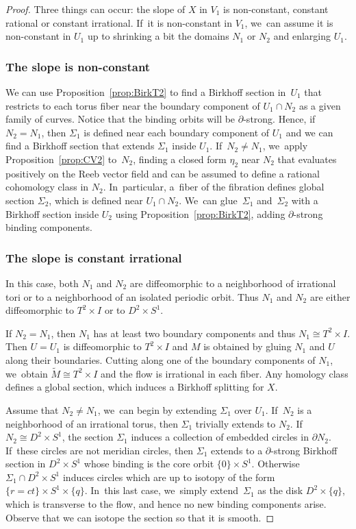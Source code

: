 \documentclass[JEP,XML,SOM,Unicode,NoEqCountersInSection,NoFloatCountersInSection,published]{cedram}
\theoremstyle{definition}
\begin{document}
\begin{proof}
Three things can occur: the slope of $X$ in $V_1$ is non-constant, constant rational or constant irrational. If~it is non-constant in $V_1$, we~can assume it is non-constant in $U_1$ up to shrinking a bit the domains $N_1$ or $N_2$ and enlarging $U_1$.

\subsubsection*{The slope is non-constant} We can use Proposition~\ref{prop:BirkT2} to find a Birkhoff section in~$U_1$ that restricts to each torus fiber near the boundary component of $U_1\cap N_2$ as a given family of curves. Notice that the binding orbits will be $\partial$-strong. Hence, if~$N_2=N_1$, then $\Sigma_1$ is defined near each boundary component of $U_1$ and we can find a Birkhoff section that extends $\Sigma_1$ inside $U_1$. If~$N_2\neq N_1$, we~apply Proposition~\ref{prop:CV2} to~$N_2$, finding a closed form $\eta_2$ near $N_2$ that evaluates positively on the Reeb vector field and can be assumed to define a rational cohomology class in $N_2$. In~particular, a~fiber of the fibration defines global section $\Sigma_2$, which is defined near $U_1\cap N_2$. We~can glue~$\Sigma_1$ and~$\Sigma_2$ with a Birkhoff section inside $U_2$ using Proposition~\ref{prop:BirkT2}, adding $\partial$-strong binding components.

\subsubsection*{The slope is constant irrational}
In this case, both $N_1$ and $N_2$ are diffeomorphic to a neighborhood of irrational tori or to a neighborhood of an isolated periodic orbit. Thus $N_1$ and $N_2$ are either diffeomorphic to $T^2\times I$ or to $D^2\times S^1$.

If $N_2=N_1$, then $N_1$ has at least two boundary components and thus $N_1\cong T^2\times I$. Then $U=U_1$ is diffeomorphic to $T^2\times I$ and $M$ is obtained by gluing $N_1$ and $U$ along their boundaries. Cutting along one of the boundary components of $N_1$, we~obtain $\widetilde{M}\cong T^2\times I$ and the flow is irrational in each fiber. Any homology class defines a global section, which induces a Birkhoff splitting for $X$.

Assume that $N_2\neq N_1$, we~can begin by extending $\Sigma_1$ over $U_1$. If~$N_2$ is a neighborhood of an irrational torus, then $\Sigma_1$ trivially extends to $N_2$.
If $N_2\cong D^2\times S^1$, the section $\Sigma_1$ induces a collection of embedded circles in $\partial N_2$. If~these circles are not meridian circles, then $\Sigma_1$ extends to a $\partial$-strong Birkhoff section in $D^2\times S^1$ whose binding is the core orbit $\{0\}\times S^1$. Otherwise $\Sigma_1\cap D^2\times S^1$ induces circles which are up to isotopy of the form $\{r=ct\}\times S^1 \times \{q\}$. In~this last case, we~simply extend~$\Sigma_1$ as the disk $D^2\times \{q\}$, which is transverse to the flow, and hence no new binding components arise. Observe that we can isotope the section so that it is smooth.


\end{proof}
\end{document}
